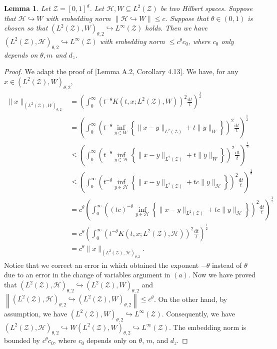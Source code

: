 \documentclass[11pt]{article}
\newcommand{\calZ}{\mathcal{Z}}
\newcommand{\calH}{\mathcal{H}}
\newcommand{\0}{\mathbf{0}}
\newtheorem{lem}{Lemma}[section]
\begin{document}
\begin{appendix}
\begin{lem}
\label{lem:embedintosobolevimplies}
Let $\calZ = [0,1]^{d}$. Let $\calH, W \subseteq L^2(\calZ)$ be two Hilbert spaces. Suppose that $\calH \hookrightarrow W$ with embedding norm $\| \calH \hookrightarrow W\| \leq c$. Suppose that $\theta\in(0,1)$ is chosen so that $\left(L^2(\calZ), W \right)_{\theta,2} \hookrightarrow L^{\infty}(\calZ)$ holds. Then we have $\left(L^2(\calZ), \calH\right)_{\theta,2} \hookrightarrow L^{\infty}(\calZ)$ with embedding norm $\leq c^{\theta}c_0$, where $c_0$ only depends on $\theta,m$ and $d_z$.
\end{lem}
\begin{proof}
We adapt the proof of \cite{kanagawa2018gaussianprocesseskernelmethods}[Lemma A.2, Corollary 4.13].
We have, for any $x \in (L^2(\calZ), W)_{\theta,2}$,
\begin{align*}
    \|x\|_{\left(L^2(\calZ), W\right)_{\theta,2}}&=  \left(\int_{0}^{\infty}\left(t^{-\theta}K\left(t,x;L^2(\calZ),W\right)\right)^{2}\frac{\mathrm{d}t}{t}\right)^{\frac{1}{2}}\\&= \left(\int_{0}^{\infty}\left(t^{-\theta}\inf_{y\in W}\left\{\|x-y\|_{L^2(\calZ)} + t\|y\|_{W}\right\}\right)^{2}\frac{\mathrm{d}t}{t}\right)^{\frac{1}{2}}\\
    &\leq \left(\int_{0}^{\infty}\left(t^{-\theta}\inf_{y\in \calH}\left\{\|x-y\|_{L^2(\calZ)} + t\|y\|_{W}\right\}\right)^{2}\frac{\mathrm{d}t}{t}\right)^{\frac{1}{2}}\\
    &\leq \left(\int_{0}^{\infty}\left(t^{-\theta}\inf_{y\in \calH}\left\{\|x-y\|_{L^2(\calZ)} + tc\|y\|_{\calH}\right\}\right)^{2}\frac{\mathrm{d}t}{t}\right)^{\frac{1}{2}}\\
    &= c^\theta \left(\int_{0}^{\infty}\left(\left(tc \right)^{-\theta}\inf_{y\in \calH}\left\{\|x-y\|_{L^2(\calZ)} + tc \|y\|_{\calH}\right\}\right)^{2}\frac{\mathrm{d}t}{t}\right)^{\frac{1}{2}}\\
    &= c^{\theta}\left(\int_{0}^{\infty}\left(t^{-\theta}K\left(t,x;L^2(\calZ),\calH\right)\right)^{2}\frac{\mathrm{d}t}{t}\right)^{\frac{1}{2}}\\
    &= c^{\theta}\|x\|_{\left(L^2(\calZ), \calH\right)_{\theta,2}} .
\end{align*}
Notice that we correct an error in \cite{kanagawa2018gaussianprocesseskernelmethods} which obtained the exponent $-\theta$ instead of $\theta$ due to an error in the change of variables argument in $(a)$.
Now we have proved that $(L^2(\calZ), \calH)_{\theta,2} \hookrightarrow (L^2(\calZ), W)_{\theta,2}$ and $\left\| (L^2(\calZ), \calH)_{\theta,2} \hookrightarrow (L^2(\calZ), W)_{\theta,2} \right\| \leq c^\theta$.
On the other hand, by assumption, we have $(L^2(\calZ), W)_{\theta,2} \hookrightarrow L^\infty(\calZ)$. Consequently, we have $(L^2(\calZ), \calH)_{\theta,2} \hookrightarrow W(L^2(\calZ), W)_{\theta,2} \hookrightarrow L^{\infty}(\calZ)$. The embedding norm is bounded by $c^{\theta}c_0$, where $c_0$ depends only on $\theta$, $m$, and $d_z$.
\end{proof}




\end{appendix}
\end{document}
